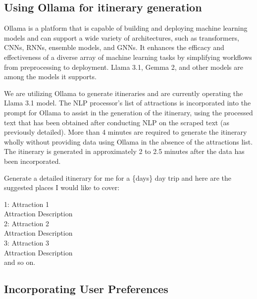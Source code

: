 \documentclass[conference]{IEEEtran}
\begin{document}
    \subsection{Using Ollama for itinerary generation}

        Ollama is a platform that is capable of building and deploying machine learning models and can support a wide variety of architectures, such as transformers, CNNs, RNNs, ensemble models, and GNNs. It enhances the efficacy and effectiveness of a diverse array of machine learning tasks by simplifying workflows from preprocessing to deployment. Llama 3.1, Gemma 2, and other models are among the models it supports.

        We are utilizing Ollama to generate itineraries and are currently operating the Llama 3.1 model. The NLP processor's list of attractions is incorporated into the prompt for Ollama to assist in the generation of the itinerary, using the processed text that has been obtained after conducting NLP on the scraped text (as previously detailed). More than 4 minutes are required to generate the itinerary wholly without providing data using Ollama in the absence of the attractions list. The itinerary is generated in approximately 2 to 2.5 minutes after the data has been incorporated.

        \begin{tcolorbox}[colframe=black!75!white, colback=white!90!black, title=Ollama Prompt to generate itinerary]
        Generate a detailed itinerary for me for a \{days\} day trip and here are the suggested places I would like to cover:

        1: Attraction 1 \\
        Attraction Description\\

        2: Attraction 2 \\
        Attraction Description\\

        3: Attraction 3 \\
        Attraction Description\\


        and so on.
        \end{tcolorbox}


    \subsection{Incorporating User Preferences}
\end{document}
